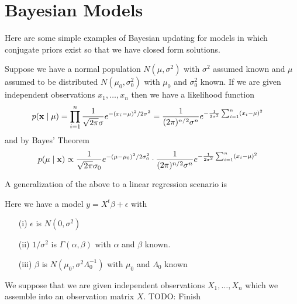 \section{Bayesian Models}
Here are some simple examples of Bayesian updating for models in which
conjugate priors exist so that we have closed form solutions.

\begin{examp}\label{Estimating a Normal mean with know variance}
Suppose we have a normal population $N(\mu, \sigma^2)$ with $\sigma^2$
assumed known and $\mu$ assumed to be distributed $N(\mu_0,
\sigma_0^2)$ with $\mu_0$ and $\sigma_0^2$ known.  If we are given
independent observations $x_1, \dotsc, x_n$ then we have a likelihood
function 
\begin{align*}
p(\bold{x}\mid \mu) &= \prod_{i=1}^n \frac{1}{\sqrt{2 \pi} \sigma}
e^{-(x_i - \mu)^2/2\sigma^2} 
= \frac{1}{(2 \pi)^{n/2}  \sigma^n} e^{-\frac{1}{2\sigma^2} \sum_{i=1}^n (x_i - \mu)^2}
\end{align*}
and by Bayes' Theorem
\begin{align*}
p(\mu \mid \bold{x}) &\propto \frac{1}{\sqrt{2\pi}\sigma_0} e^{-(\mu -
  \mu_0)^2/2\sigma_0^2} \cdot \frac{1}{(2 \pi)^{n/2}  \sigma^n} e^{-\frac{1}{2\sigma^2} \sum_{i=1}^n (x_i - \mu)^2}
\end{align*}
\end{examp}

A generalization of the above to a linear regression scenario is
\begin{examp}\label{BayesianUnivariateLinearRegression}Here we have a
  model $y = X^t \beta + \epsilon$ with 
\begin{itemize}
\item[(i)]  $\epsilon$ is $N(0, \sigma^2)$ 
\item[(ii)]  $1/\sigma^2$ is $\Gamma(\alpha, \beta)$ with $\alpha$ and
  $\beta$ known.
\item[(iii)] $\beta$ is $N(\mu_0, \sigma^2 \Lambda_0^{-1})$ with
  $\mu_0$ and $\Lambda_0$ known
\end{itemize}
We suppose that we are given independent observations $X_1, \dotsc,
X_n$ which we assemble into an observation matrix $X$.  
TODO: Finish
\end{examp}